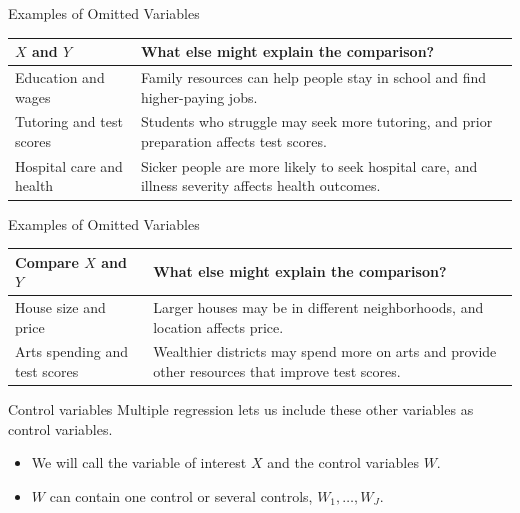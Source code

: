 \documentclass[aspectratio=169,t,11pt,table]{beamer}
\begin{document}
\begin{frame}{Examples of Omitted Variables}
  \small
  \renewcommand{\arraystretch}{1.3}
  \begin{tabularx}{\textwidth}{@{}>{\raggedright\arraybackslash}p{} >{\raggedright\arraybackslash}X@{}}
    \toprule
    \textbf{$X$ and $Y$} & \textbf{What else might explain the comparison?} \\
    \midrule
    Education and wages
      & Family resources can help people stay in school and find higher-paying jobs. \\
    Tutoring and test scores
      & Students who struggle may seek more tutoring, and prior preparation affects test scores. \\
    Hospital care and health
      & Sicker people are more likely to seek hospital care, and illness severity affects health outcomes. \\
    \bottomrule
  \end{tabularx}
\end{frame}

\begin{frame}{Examples of Omitted Variables}
  \small
  \renewcommand{\arraystretch}{1.3}
  \begin{tabularx}{\textwidth}{@{}>{\raggedright\arraybackslash}p{} >{\raggedright\arraybackslash}X@{}}
    \toprule
    \textbf{Compare $X$ and $Y$} & \textbf{What else might explain the comparison?} \\
    \midrule
    House size and price
      & Larger houses may be in different neighborhoods, and location affects price. \\
    Arts spending and test scores
      & Wealthier districts may spend more on arts and provide other resources that improve test scores. \\
    \bottomrule
  \end{tabularx}
\end{frame}

\begin{frame}{Control variables}
  Multiple regression lets us include these other variables as \alert{control variables}.
  \begin{itemize}
    \item We will call the variable of interest $X$ and the control variables $W$.
    \item $W$ can contain one control or several controls, $W_1, \dots, W_J$.
  \end{itemize}
\end{frame}
\end{document}
